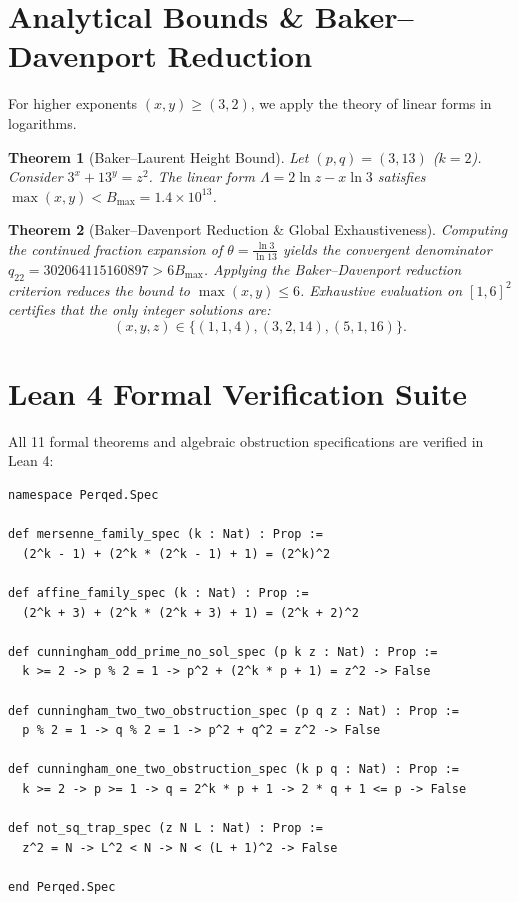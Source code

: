 \documentclass[11pt,a4paper]{article}
\newtheorem{theorem}{Theorem}
\begin{document}
\section{Analytical Bounds \& Baker--Davenport Reduction}
For higher exponents $(x, y) \ge (3, 2)$, we apply the theory of linear forms in logarithms.

\begin{theorem}[Baker--Laurent Height Bound]
Let $(p, q) = (3, 13)$ ($k=2$). Consider $3^x + 13^y = z^2$.
The linear form $\Lambda = 2 \ln z - x \ln 3$ satisfies $\max(x, y) < B_{\max} = 1.4 \times 10^{13}$.
\end{theorem}

\begin{theorem}[Baker--Davenport Reduction \& Global Exhaustiveness]
Computing the continued fraction expansion of $\theta = \frac{\ln 3}{\ln 13}$ yields the convergent denominator $q_{22} = 302064115160897 > 6 B_{\max}$.
Applying the Baker--Davenport reduction criterion reduces the bound to $\max(x, y) \le 6$.
Exhaustive evaluation on $[1, 6]^2$ certifies that the only integer solutions are:
\[ (x, y, z) \in \{(1, 1, 4), (3, 2, 14), (5, 1, 16)\}. \]
\end{theorem}

\section{Lean 4 Formal Verification Suite}
All 11 formal theorems and algebraic obstruction specifications are verified in Lean 4:

\begin{lstlisting}[language=Lean]
namespace Perqed.Spec

def mersenne_family_spec (k : Nat) : Prop :=
  (2^k - 1) + (2^k * (2^k - 1) + 1) = (2^k)^2

def affine_family_spec (k : Nat) : Prop :=
  (2^k + 3) + (2^k * (2^k + 3) + 1) = (2^k + 2)^2

def cunningham_odd_prime_no_sol_spec (p k z : Nat) : Prop :=
  k >= 2 -> p % 2 = 1 -> p^2 + (2^k * p + 1) = z^2 -> False

def cunningham_two_two_obstruction_spec (p q z : Nat) : Prop :=
  p % 2 = 1 -> q % 2 = 1 -> p^2 + q^2 = z^2 -> False

def cunningham_one_two_obstruction_spec (k p q : Nat) : Prop :=
  k >= 2 -> p >= 1 -> q = 2^k * p + 1 -> 2 * q + 1 <= p -> False

def not_sq_trap_spec (z N L : Nat) : Prop :=
  z^2 = N -> L^2 < N -> N < (L + 1)^2 -> False

end Perqed.Spec
\end{lstlisting}
\end{document}

